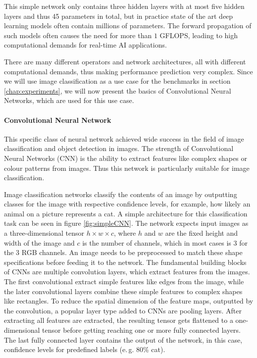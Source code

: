 This simple network only contains three hidden layers with at most five hidden layers and thus 45 parameters in total, but in practice state of the art deep learning models often contain millions of parameters. 
The forward propagation of such models often causes the need for more than $1$ GFLOPS, leading to high computational demands for real-time AI applications.


There are many different operators and network architectures, all with different computational demands, thus making performance prediction very complex.
Since we will use image classification as a use case for the benchmarks in section \ref{chap:experiments}, we will now present the basics of Convolutional Neural Networks, which are used for this use case.

\paragraph{Convolutional Neural Network}
This specific class of neural network achieved wide success in the field of image classification and object detection in images.
The strength of Convolutional Neural Networks (CNN) is the ability to extract features like complex shapes or colour patterns from images. Thus this network is particularly suitable for image classification.

Image classification networks classify the contents of an image by outputting classes for the image with respective confidence levels, for example, how likely an animal on a picture represents a cat.
A simple architecture for this classification task can be seen in figure \ref{fig:simpleCNN}.
The network expects input images as a three-dimensional tensor $h\times w\times c$, where $h$ and $w$ are the fixed height and width of the image and $c$ is the number of channels, which in most cases is $3$ for the $3$ RGB channels.
An image needs to be preprocessed to match these shape specifications before feeding it to the network.
The fundamental building blocks of CNNs are multiple convolution layers, which extract features from the images. The first convolutional extract simple features like edges from the image, while the later convolutional layers combine these simple features to complex shapes like rectangles.
To reduce the spatial dimension of the feature maps, outputted by the convolution, a popular layer type added to CNNs are pooling layers.
After extracting all features are extracted, the resulting tensor gets flattened to a one-dimensional tensor before getting reaching one or more fully connected layers.
The last fully connected layer contains the output of the network, in this case, confidence levels for predefined labels (e.\,g. $80$\% cat).  


